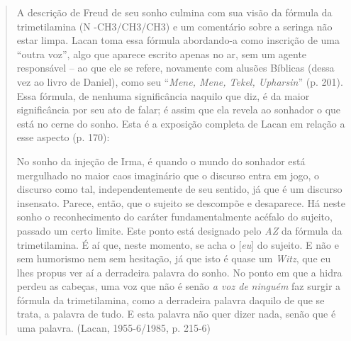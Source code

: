 \begin{quote}
A descrição de Freud de seu sonho culmina com sua visão da fórmula da
trimetilamina (N -CH3/CH3/CH3) e um comentário sobre a seringa não estar
limpa. Lacan toma essa fórmula abordando-a como inscrição de uma ``outra
voz'', algo que aparece escrito apenas no ar, sem um agente responsável
-- ao que ele se refere, novamente com alusões Bíblicas (dessa vez ao
livro de Daniel), como seu ``\emph{Mene, Mene, Tekel, Upharsin}'' (p.
201). Essa fórmula, de nenhuma significância naquilo que diz, é da maior
significância por seu ato de falar; é assim que ela revela ao sonhador o
que está no cerne do sonho. Esta é a exposição completa de Lacan em
relação a esse aspecto (p. 170):

No sonho da injeção de Irma, é quando o mundo do sonhador está
mergulhado no maior caos imaginário que o discurso entra em jogo, o
discurso como tal, independentemente de seu sentido, já que é um
discurso insensato. Parece, então, que o sujeito se descompõe e
desaparece. Há neste sonho o reconhecimento do caráter fundamentalmente
acéfalo do sujeito, passado um certo limite. Este ponto está designado
pelo \emph{AZ} da fórmula da trimetilamina. É aí que, neste momento, se
acha o {[}\emph{eu}{]} do sujeito. E não e sem humorismo nem sem
hesitação, já que isto é quase um \emph{Witz}, que eu lhes propus ver aí
a derradeira palavra do sonho. No ponto em que a hidra perdeu as
cabeças, uma voz que não é senão \emph{a voz de} \emph{ninguém} faz
surgir a fórmula da trimetilamina, como a derradeira palavra daquilo de
que se trata, a palavra de tudo. E esta palavra não quer dizer nada,
senão que é uma palavra. (Lacan, 1955-6/1985, p. 215-6)
\end{quote}

